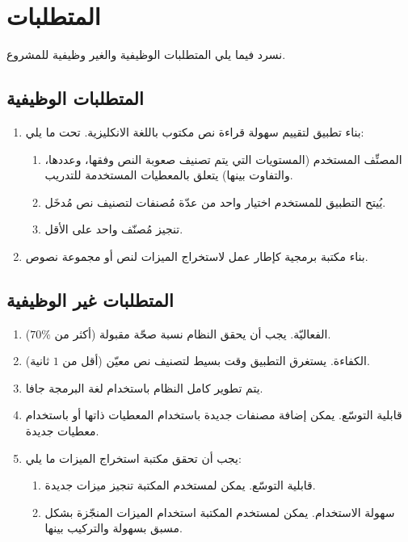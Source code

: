\section{المتطلبات}
نسرد فيما يلي المتطلبات الوظيفية والغير وظيفية للمشروع.

\subsection{المتطلبات الوظيفية}

\begin{enumerate}
	\item 
	بناء تطبيق لتقييم سهولة قراءة نص مكتوب باللغة الانكليزية. تحت ما يلي:
	\begin{enumerate}
		\item 
		المصنِّف المستخدم (المستويات التي يتم تصنيف صعوبة النص وفقها، وعددها، والتفاوت بينها)
		يتعلق بالمعطيات المستخدمة للتدريب.
		\item 
		يُيتح التطبيق للمستخدم اختيار واحد من عدّة مُصنفات لتصنيف نص مُدخَل.
		\item 
		تنجيز مُصنّف واحد على الأقل.
	\end{enumerate}

	\item 
	بناء مكتبة برمجية كإطار عمل لاستخراج الميزات لنص أو مجموعة نصوص.
\end{enumerate}




\subsection{المتطلبات غير الوظيفية}
\begin{enumerate}
	\item 
	الفعاليّة. يجب أن يحقق النظام نسبة صحّة مقبولة (أكثر من $70\%$).
	\item 
	الكفاءة. يستغرق التطبيق وقت بسيط لتصنيف نص معيّن (أقل من $1$ ثانية).
	\item 
	يتم تطوير كامل النظام باستخدام لغة البرمجة جافا.
	\item 
	قابلية التوسّع. يمكن إضافة مصنفات جديدة باستخدام المعطيات ذاتها أو باستخدام معطيات جديدة.
	\item 
	يجب أن تحقق مكتبة استخراج الميزات ما يلي:
	\begin{enumerate}
		\item 
		قابلية التوسّع. يمكن لمستخدم المكتبة تنجيز ميزات جديدة.
		\item
		سهولة الاستخدام. يمكن لمستخدم المكتبة استخدام الميزات المنجّزة بشكل مسبق بسهولة والتركيب بينها.
	\end{enumerate}

\end{enumerate}



